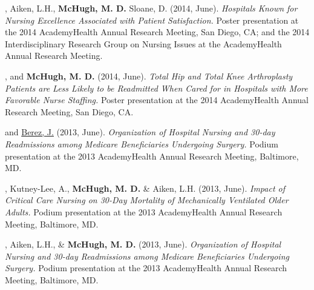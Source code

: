 \documentclass[10pt,]{article}
\begin{document}
{{{{{{{{{{{{{{{\begin{hangparas}{.25in}{1}

, Aiken, L.H., {\textbf {McHugh, M. D.}} Sloane, D. (2014, June). {\textit {Hospitals Known for Nursing Excellence Associated with Patient Satisfaction.}} Poster presentation at the 2014 AcademyHealth Annual Research Meeting, San Diego, CA; and the 2014 Interdisciplinary Research Group on Nursing Issues at the AcademyHealth Annual Research Meeting.

\end{hangparas}



\begin{hangparas}{.25in}{1}

, and {\textbf {McHugh, M. D.}} (2014, June). {\textit {Total Hip and Total Knee Arthroplasty Patients are Less Likely to be Readmitted When Cared for in Hospitals with More Favorable Nurse Staffing.}} Poster presentation at the 2014 AcademyHealth Annual Research Meeting, San Diego, CA.

\end{hangparas}



\begin{hangparas}{.25in}{1}

 and {\underline {Berez, J.}} (2013, June). {\textit {Organization of Hospital Nursing and 30-day Readmissions among Medicare Beneficiaries Undergoing Surgery.}} Podium presentation at the 2013 AcademyHealth Annual Research Meeting, Baltimore, MD.

\end{hangparas}



\begin{hangparas}{.25in}{1}

, Kutney-Lee, A., {\textbf {McHugh, M. D.}} \& Aiken, L.H. (2013, June). {\textit {Impact of Critical Care Nursing on 30-Day Mortality of Mechanically Ventilated Older Adults.}} Podium presentation at the 2013 AcademyHealth Annual Research Meeting, Baltimore, MD.

\end{hangparas}



\begin{hangparas}{.25in}{1}

, Aiken, L.H., \& {\textbf {McHugh, M. D.}} (2013, June). {\textit {Organization of Hospital Nursing and 30-day Readmissions among Medicare Beneficiaries Undergoing Surgery.}} Podium presentation at the 2013 AcademyHealth Annual Research Meeting, Baltimore, MD.


\end{hangparas}}}}}}}}}}}}}}}}
\end{document}
